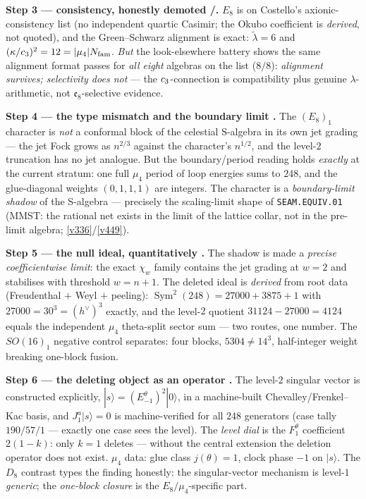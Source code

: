 \par\smallskip\noindent\textbf{Step 3 --- consistency, honestly demoted \mE/\mC.}
$E_8$ is on Costello's axionic-consistency list (no
independent quartic Casimir; the Okubo coefficient is \emph{derived}, not quoted), and the Green--Schwarz
alignment is exact: $\tilde\lambda=6$ and $(\kappa/c_3)^2=12=|\mu_4|N_{\mathrm{fam}}$. \emph{But} the
look-elsewhere battery shows the same alignment format passes for \emph{all eight} algebras on the list
($8/8$): \emph{alignment survives; selectivity does not} --- the $c_3$-connection is compatibility
plus genuine $\lambda$-arithmetic, not $\mathfrak e_8$-selective evidence.

\par\smallskip\noindent\textbf{Step 4 --- the type mismatch and the boundary limit \mE.}
The $(E_8)_1$ character is \emph{not} a conformal
block of the celestial S-algebra in its own jet grading --- the jet Fock grows as $n^{2/3}$ against the
character's $n^{1/2}$, and the level-$2$ truncation has no jet analogue. But the boundary/period reading
holds \emph{exactly} at the current stratum: one full $\mu_4$ period of loop energies sums to $248$, and
the glue-diagonal weights $(0,1,1,1)$ are integers. The character is a \emph{boundary-limit shadow} of
the S-algebra --- precisely the scaling-limit shape of \texttt{SEAM.EQUIV.01} (MMST: the rational net
exists in the limit of the lattice collar, not in the pre-limit algebra; \vref{v336}/\vref{v449}).

\par\smallskip\noindent\textbf{Step 5 --- the null ideal, quantitatively \mE.}
The shadow is made a \emph{precise coefficientwise
limit}: the exact $\chi_w$ family contains the jet grading at $w{=}2$ and stabilises with threshold
$w=n{+}1$. The deleted ideal is \emph{derived} from root data (Freudenthal $+$ Weyl $+$ peeling):
$\operatorname{Sym}^2(248)=27000{+}3875{+}1$ with $27000=30^3=(h^\vee)^3$ exactly, and the level-$2$
quotient $31124{-}27000=4124$ equals the independent $\mu_4$ theta-split sector sum --- two routes, one
number. The $SO(16)_1$ negative control separates: four blocks, $5304\neq14^3$, half-integer weight
breaking one-block fusion. 

\par\smallskip\noindent\textbf{Step 6 --- the deleting object as an operator \mE.}
The level-$2$ singular vector is constructed
explicitly, $|s\rangle=(E^\theta_{-1})^2|0\rangle$, in a machine-built Chevalley/Frenkel--Kac basis, and
$J^a_1|s\rangle=0$ is machine-verified for all $248$ generators (case tally $190/57/1$ --- exactly one
case sees the level). The \emph{level dial} is the $F^\theta_1$ coefficient $2(1{-}k)$: only $k{=}1$
deletes --- without the central extension the deletion operator does not exist. $\mu_4$ data: glue class
$j(\theta)=1$, clock phase $-1$ on $|s\rangle$. The $D_8$ contrast types the finding honestly: the
singular-vector mechanism is level-$1$ \emph{generic}; the \emph{one-block closure} is the
$E_8/\mu_4$-specific part. 

